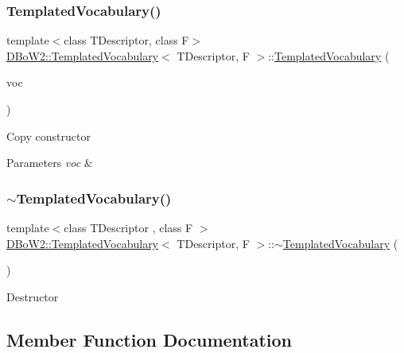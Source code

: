 \subsubsection{\texorpdfstring{Templated\+Vocabulary()}{TemplatedVocabulary()}\hspace{0.1cm}{\footnotesize\ttfamily [4/4]}}
{\footnotesize\ttfamily template$<$class T\+Descriptor, class F$>$ \\
\hyperlink{classDBoW2_1_1TemplatedVocabulary}{D\+Bo\+W2\+::\+Templated\+Vocabulary}$<$ T\+Descriptor, F $>$\+::\hyperlink{classDBoW2_1_1TemplatedVocabulary}{Templated\+Vocabulary} (\begin{DoxyParamCaption}\item[{const \hyperlink{classDBoW2_1_1TemplatedVocabulary}{Templated\+Vocabulary}$<$ T\+Descriptor, F $>$ \&}]{voc }\end{DoxyParamCaption})}

Copy constructor 
\begin{DoxyParams}{Parameters}
{\em voc} & \\
\hline
\end{DoxyParams}
\mbox{\label{classDBoW2_1_1TemplatedVocabulary_a9d15f985a0c3badc1518be0fbe663099}} 
\subsubsection{\texorpdfstring{$\sim$\+Templated\+Vocabulary()}{~TemplatedVocabulary()}}
{\footnotesize\ttfamily template$<$class T\+Descriptor , class F $>$ \\
\hyperlink{classDBoW2_1_1TemplatedVocabulary}{D\+Bo\+W2\+::\+Templated\+Vocabulary}$<$ T\+Descriptor, F $>$\+::$\sim$\hyperlink{classDBoW2_1_1TemplatedVocabulary}{Templated\+Vocabulary} (\begin{DoxyParamCaption}{ }\end{DoxyParamCaption})\hspace{0.3cm}{\ttfamily [virtual]}}

Destructor 

\subsection{Member Function Documentation}
\mbox{\label{classDBoW2_1_1TemplatedVocabulary_a3679b5a8f2043021a4faab99ccfe4ebe}} 
